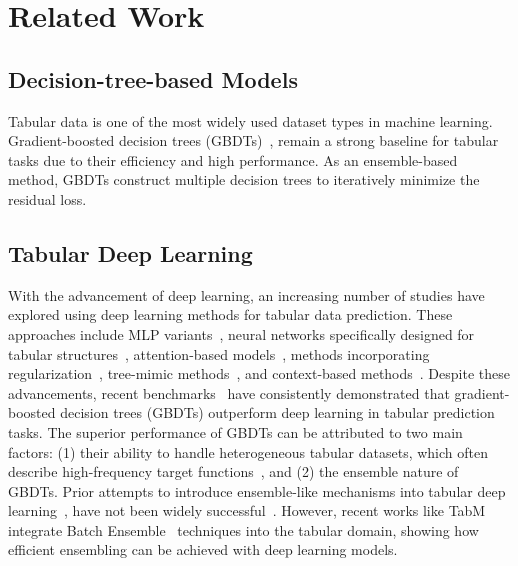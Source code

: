 \section{Related Work}
\label{sec:related}

\subsection{Decision-tree-based Models}
Tabular data is one of the most widely used dataset types in machine learning. Gradient-boosted decision trees (GBDTs)~\cite{chen2016xgboost,Prokhorenkova2018Catboost,ke2017lightgbm},  remain a strong baseline for tabular tasks due to their efficiency and high performance. As an ensemble-based method, GBDTs construct multiple decision trees to iteratively minimize the residual loss. %

\subsection{Tabular Deep Learning}
With the advancement of deep learning, an increasing number of studies have explored using deep learning methods for tabular data prediction. These approaches include MLP variants~\cite{KlambauerUMH17SNN,GorishniyRKB21Revisiting,Gorishniy2022On,David2024RealMLP}, neural networks specifically designed for tabular structures~\cite{WangFFW17DCN,WangSCJLHC21DCNv2,Chen2023TabCaps}, attention-based models~\cite{SongS0DX0T19AutoInt,Huang2020TabTransformer,GorishniyRKB21Revisiting,Chen2023Excel}, methods incorporating regularization~\cite{PTARL,jeffares2023tangos,Wu2024SwitchTab}, tree-mimic methods~\cite{ArikP21TabNet,PopovMB20Neural,Badirli2020GrowNet}, and context-based methods~\cite{gorishniy2023tabr,Ye2024ModernNCA}. Despite these advancements, recent benchmarks~\cite{Grinsztajn2022Why,McElfreshKVCRGW23when,YeACloser} have consistently demonstrated that gradient-boosted decision trees (GBDTs) outperform deep learning in tabular prediction tasks.
The superior performance of GBDTs can be attributed to two main factors: (1) their ability to handle heterogeneous tabular datasets, which often describe high-frequency target functions~\cite{DBLP:conf/icml/BasriGGJKK20,Grinsztajn2022Why},  and (2) the ensemble nature of GBDTs. Prior attempts to introduce ensemble-like mechanisms into tabular deep learning~\cite{Badirli2020GrowNet,PopovMB20Neural,DBLP:conf/icml/Chen2023Trompt}, have not been widely successful~\cite{Grinsztajn2022Why,YeACloser}. However, recent works like TabM~\cite{Yury2024TabM} integrate Batch Ensemble~\cite{WenTB20BatchEnsemble} techniques into the tabular domain, showing how efficient ensembling can be achieved with deep learning models. 

